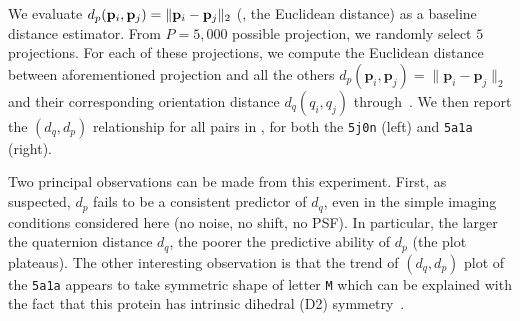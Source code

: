 

We evaluate $d_p(\mathbf{p}_i, \mathbf{p}_j) = \Vert \mathbf{p}_i - \mathbf{p}_j \Vert_2$ (\ie, the Euclidean distance) as a baseline distance estimator.
From $P = 5,000$ possible projection, we randomly select $5$ projections.
For each of these projections, we compute the Euclidean distance between aforementioned projection and all the others $d_p(\mathbf{p}_i,\mathbf{p}_j)=\lVert\mathbf{p}_i-\mathbf{p}_j\rVert_2$ and their corresponding orientation distance $d_q(q_i,q_j)$ through~.
We then report the $(d_q,d_p)$ relationship for all pairs in , for both the \texttt{5j0n} (left) and \texttt{5a1a} (right).

Two principal observations can be made from this experiment.
First, as suspected, $d_p$ fails to be a consistent predictor of $d_q$, even in the simple imaging conditions considered here (no noise, no shift, no PSF).
In particular, the larger the quaternion distance $d_q$, the poorer the predictive ability of $d_p$ (the plot plateaus).
The other interesting observation is that the trend of $(d_q,d_p)$ plot of the \texttt{5a1a} appears to take symmetric shape of letter \texttt{M} which can be explained with the fact that this protein has intrinsic dihedral (D2) symmetry~\cite{noauthor_d2sym_nodate,noauthor_5a1asym_nodate}.

